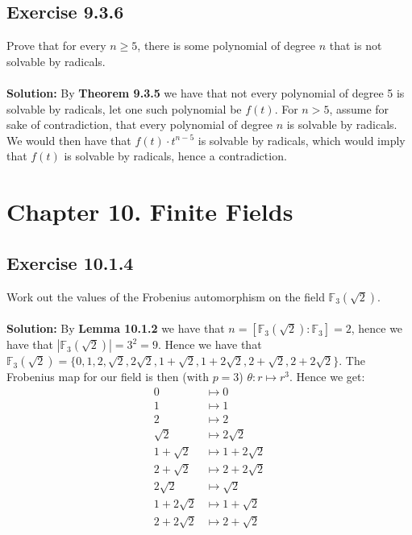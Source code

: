 \documentclass{article}
\begin{document}
\subsection*{Exercise 9.3.6}
Prove that for every $n \ge 5$, there is some polynomial of degree $n$ that is not solvable by radicals. 
\\\\
\textbf{Solution:}
By \textbf{Theorem 9.3.5} we have that not every polynomial of degree 5 is solvable by radicals, let one such polynomial be $f(t)$. 
For $n>5$, assume for sake of contradiction, that every polynomial of degree $n$ is solvable by radicals.
We would then have that $f(t)\cdot t^{n-5}$ is solvable by radicals, which would imply that $f(t)$ is solvable
by radicals, hence a contradiction.

\section*{Chapter 10. Finite Fields}
\subsection*{Exercise 10.1.4}
Work out the values of the Frobenius automorphism on the field $\mathbb{F}_3(\sqrt 2)$.
\\\\
\textbf{Solution:}
By \textbf{Lemma 10.1.2} we have that $n = [\mathbb{F}_3(\sqrt 2): \mathbb{F}_3] = 2$, hence we have that
$|\mathbb{F}_3(\sqrt 2)| = 3^2 = 9$. Hence we have that $\mathbb{F}_3(\sqrt 2) = \{0, 1, 2, \sqrt 2, 2 \sqrt 2, 1+ \sqrt 2, 1+ 2\sqrt2, 2+ \sqrt2, 2+2\sqrt2\}$.
The Frobenius map for our field is then (with $p = 3$) $\theta: r \mapsto r^3$.
Hence we get:
\begin{equation*}
    \begin{aligned}
        0 & \mapsto 0\\
        1 & \mapsto 1\\
        2 & \mapsto 2\\
        \sqrt2 & \mapsto 2\sqrt2\\
        1+\sqrt2 & \mapsto 1 + 2\sqrt2\\
        2+\sqrt2 & \mapsto 2 + 2\sqrt2\\
        2\sqrt2 & \mapsto \sqrt2\\
        1+2\sqrt2 & \mapsto 1 + \sqrt2\\
        2+2\sqrt2 & \mapsto 2 + \sqrt2\\
    \end{aligned}
\end{equation*}
\end{document}
